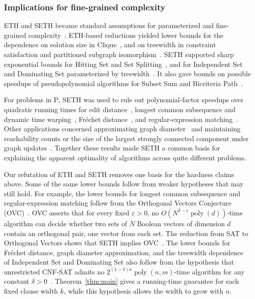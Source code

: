 \documentclass[11pt,reqno]{amsart}
\numberwithin{equation}{section}
\theoremstyle{definition}\newtheorem{definition}[theorem]{Definition}
\theoremstyle{remark}\newtheorem{remark}[theorem]{Remark}
\newcommand{\poly}{\operatorname{poly}}
\begin{document}
\subsubsection{Implications for fine-grained complexity}\label{subsec:related-consequences}
ETH and SETH became standard assumptions for parameterized and
fine-grained complexity~\cite{IPZ,VW19}.
ETH-based reductions yielded lower bounds for the dependence on
solution size in Clique~\cite{CHKX06}, and on treewidth in constraint
satisfaction and partitioned subgraph isomorphism~\cite{Marx10}.
SETH supported sharp exponential bounds for Hitting Set and Set
Splitting~\cite{CDL16}, and for Independent Set and Dominating Set
parameterized by treewidth~\cite{LMS18}.
It also gave bounds on possible speedups of pseudopolynomial algorithms
for Subset Sum and Bicriteria Path~\cite{ABHS19}.

For problems in $\mathrm P$, SETH was used to rule out polynomial-factor
speedups over quadratic running times for edit
distance~\cite{BackursIndyk18}, longest common subsequence and dynamic
time warping~\cite{BK15}, Fr\'echet distance~\cite{Bri14}, and
regular-expression matching~\cite{BI16}.
Other applications concerned approximating graph
diameter~\cite{RV13} and maintaining reachability counts or the size
of the largest strongly connected component under graph
updates~\cite{AW14}.
Together these results made SETH a common basis for explaining the
apparent optimality of algorithms across quite different problems.

Our refutation of ETH and SETH removes one basis for the hardness claims
above. Some of the same lower bounds follow from weaker hypotheses that
may still hold. For example, the lower bounds for longest common
subsequence and regular-expression matching follow from the Orthogonal
Vectors Conjecture (OVC)~\cite{BK15,BI16}. OVC asserts that for every
fixed $\varepsilon>0$, no $O(N^{2-\varepsilon}\poly(d))$-time algorithm
can decide whether two sets of $N$ Boolean vectors of dimension $d$
contain an orthogonal pair, one vector from each set. The reduction
from SAT to Orthogonal Vectors shows that SETH implies OVC~\cite{Wil05,VW19}.
The lower bounds for Fr\'echet distance, graph diameter approximation,
and the treewidth dependence of Independent Set and Dominating Set also
follow from the hypothesis that unrestricted CNF-SAT admits no
$2^{(1-\delta)n}\poly(n,m)$-time algorithm for any constant
$\delta>0$~\cite{Bri14,RV13,LMS18}. Theorem~\ref{thm:main} gives a
running-time guarantee for each fixed clause width $k$, while this
hypothesis allows the width to grow with $n$.
\end{document}
